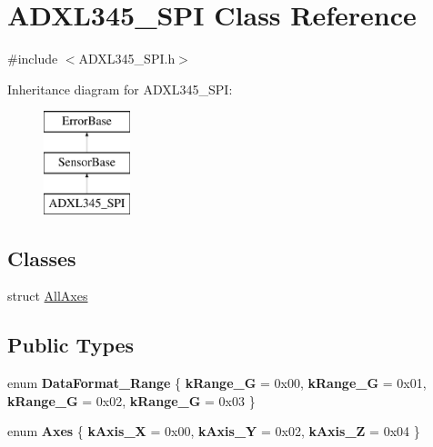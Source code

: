\hypertarget{classADXL345__SPI}{\section{\-A\-D\-X\-L345\-\_\-\-S\-P\-I \-Class \-Reference}
\label{classADXL345__SPI}
}


{\ttfamily \#include $<$\-A\-D\-X\-L345\-\_\-\-S\-P\-I.\-h$>$}

\-Inheritance diagram for \-A\-D\-X\-L345\-\_\-\-S\-P\-I\-:\begin{figure}[H]
\begin{center}
\leavevmode
\includegraphics[height=3.000000cm]{classADXL345__SPI}
\end{center}
\end{figure}
\subsection*{\-Classes}
\begin{DoxyCompactItemize}
\item 
struct \hyperlink{structADXL345__SPI_1_1AllAxes}{\-All\-Axes}
\end{DoxyCompactItemize}
\subsection*{\-Public \-Types}
\begin{DoxyCompactItemize}
\item 
enum {\bfseries \-Data\-Format\-\_\-\-Range} \{ {\bfseries k\-Range\-\_\-G} = 0x00, 
{\bfseries k\-Range\-\_\-G} = 0x01, 
{\bfseries k\-Range\-\_\-G} = 0x02, 
{\bfseries k\-Range\-\_\-G} = 0x03
 \}
\item 
enum {\bfseries \-Axes} \{ {\bfseries k\-Axis\-\_\-\-X} = 0x00, 
{\bfseries k\-Axis\-\_\-\-Y} = 0x02, 
{\bfseries k\-Axis\-\_\-\-Z} = 0x04
 \}
\end{DoxyCompactItemize}
